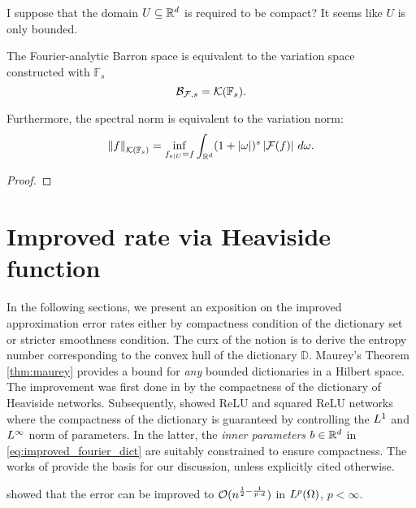 I suppose that the domain $U \subseteq \mathbb{R}^d$ is required to be compact?
It seems like $U$ is only bounded.

\begin{theorem}
The Fourier-analytic Barron space is equivalent to the variation space
constructed with $\mathbb{F}_s$
\begin{equation}
    \mathcal{B}_{\mathcal{F}, s} = \mathcal{K}({\mathbb{F}_s}).
\end{equation}

Furthermore, the spectral norm is equivalent to the variation norm:
\begin{equation}
    \left\| {f} \right\|_{\mathcal{K}({\mathbb{F}_s})} =
    \inf_{f_{e\mid U} = f} \int_{\mathbb{R}^d} 
    (1+\left| \omega \right|)^s \left| \mathcal{F}(f) \right| \,d\omega.
\end{equation}
\end{theorem}

\begin{proof}
    
\end{proof}


\section{Improved rate via Heaviside function}
\label{sec:improved_heaviside}

In the following sections, we present an exposition on the improved
approximation error rates either by compactness condition of the dictionary set
or stricter smoothness condition. The curx of the notion is to derive the
entropy number corresponding to the convex hull of the dictionary $\mathbb{D}$.
Maurey's Theorem \ref{thm:maurey} provides a bound for \textit{any} bounded
dictionaries in a Hilbert space. The improvement was first done in
\cite{makovozRandomApproximantsNeural1996} by the compactness of the dictionary
of Heaviside networks. Subsequently,
\cite{klusowskiApproximationCombinationsReLU2018} showed ReLU and squared ReLU
networks where the compactness of the dictionary is guaranteed by controlling
the $L^{1}$ and $L^{\infty}$ norm of parameters. In the latter, the
\textit{inner parameters} $b\in\mathbb{R}^d$ in \eqref{eq:improved_fourier_dict} are
suitably constrained to ensure compactness. The works of
\cite{maUniformApproximationRates2022, siegelSharpBoundsApproximation2022,
klusowskiApproximationCombinationsReLU2018a} provide the basis for our
discussion, unless explicitly cited otherwise.

\cite{makovozRandomApproximantsNeural1996} showed that the error can be improved
to $\mathcal{O}(n^{\frac{1}{2} - \frac{1}{p \cdot d}})$ in $L^{p}(\Omega)$, $p <
\infty$.


